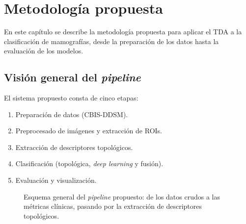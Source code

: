 \chapter{Metodología propuesta}
\label{cap:metodologia}

En este capítulo se describe la metodología propuesta para aplicar el TDA a la
clasificación de mamografías, desde la preparación de los datos hasta la
evaluación de los modelos.

\section{Visión general del \textit{pipeline}}
El sistema propuesto consta de cinco etapas:
\begin{enumerate}
  \item Preparación de datos (CBIS-DDSM).
  \item Preprocesado de imágenes y extracción de ROIs.
  \item Extracción de descriptores topológicos.
  \item Clasificación (topológica, \textit{deep learning} y fusión).
  \item Evaluación y visualización.
\end{enumerate}

\begin{figure}[H]
\centering
{}
\caption{Esquema general del \textit{pipeline} propuesto: de los datos crudos a
las métricas clínicas, pasando por la extracción de descriptores topológicos.}
\label{fig:pipeline}
\end{figure}

